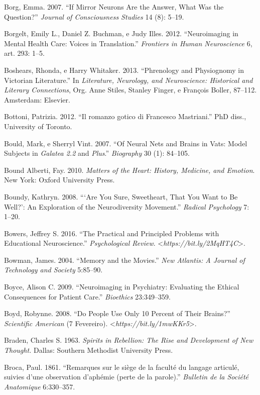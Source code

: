 {\begin{Parskip}
Borg, Emma. 2007. ``If Mirror Neurons Are the Answer, What Was the
Question?'' \emph{Journal of Consciousness Studies} 14 (8): 5--19.

Borgelt, Emily L., Daniel Z. Buchman, e Judy Illes. 2012. ``Neuroimaging
in Mental Health Care: Voices in Translation.'' \emph{Frontiers in Human
Neuroscience} 6, art. 293: 1--5.

Boshears, Rhonda, e Harry Whitaker. 2013. ``Phrenology and Physiognomy
in Victorian Literature.'' In \emph{Literature, Neurology, and
Neuroscience: Historical and Literary Connections}, Org. Anne Stiles,
Stanley Finger, e François Boller, 87--112. Amsterdam: Elsevier.

Bottoni, Patrizia. 2012. ``Il romanzo gotico di Francesco Mastriani.''
PhD diss., University of Toronto.

Bould, Mark, e Sherryl Vint. 2007. ``Of Neural Nets and Brains in Vats:
Model Subjects in \emph{Galatea 2.2} and \emph{Plus}.'' \emph{Biography}
30 (1): 84--105.

Bound Alberti, Fay. 2010. \emph{Matters of the Heart: History, Medicine,
and Emotion}. New York: Oxford University Press.

Boundy, Kathryn. 2008. ```Are You Sure, Sweetheart, That You Want to Be
Well?': An Exploration of the Neurodiversity Movement.'' \emph{Radical
Psychology} 7: 1--20.

Bowers, Jeffrey S. 2016. ``The Practical and Principled Problems with
Educational Neuroscience.'' \emph{Psychological Review}.
\textless{}\emph{https://bit.ly/2MqHT4C}\textgreater{}.

Bowman, James. 2004. ``Memory and the Movies.'' \emph{New Atlantis: A
Journal of Technology and Society} 5:85--90.

Boyce, Alison C. 2009. ``Neuroimaging in Psychiatry: Evaluating the
Ethical Consequences for Patient Care.'' \emph{Bioethics} 23:349--359.

Boyd, Robynne. 2008. ``Do People Use Only 10 Percent of Their Brains?''
\emph{Scientific American} (7 Fevereiro).
\textless{}\emph{https://bit.ly/1mwKKr5}\textgreater{}.

Braden, Charles S. 1963. \emph{Spirits in Rebellion: The Rise and
Development of New Thought.} Dallas: Southern Methodist University
Press.

Broca, Paul. 1861. ``Remarques sur le siège de la faculté du langage
articulé, suivies d'une observation d'aphémie (perte de la parole).''
\emph{Bulletin de la Société Anatomique} 6:330--357.


\end{Parskip}}
